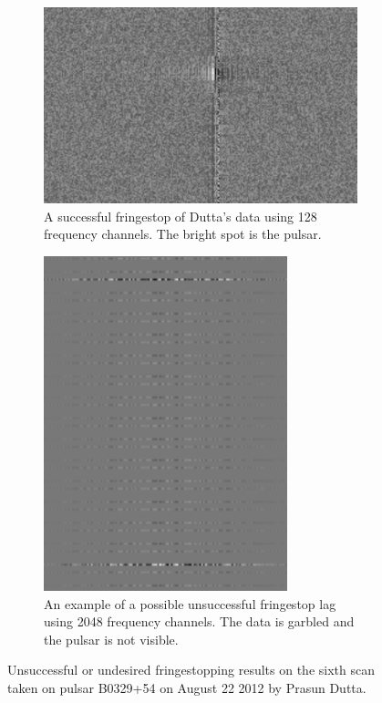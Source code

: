 \documentclass[a4paper,12pt]{article}
\begin{document}
\begin{figure}
\centering
\begin{subfigure}{0.5\textwidth}
  \centering
  \includegraphics[width=\linewidth]{256ChanLag.pdf}
  \caption{A successful fringestop of Dutta's data using 128 frequency channels. The bright spot is the pulsar.}
  \label{fig:sub1}
\end{subfigure}%
\begin{subfigure}{0.5\textwidth}
  \centering
  \includegraphics[width=0.8\linewidth]{4096ChanFailedLag.pdf}
  \caption{An example of a possible unsuccessful fringestop lag using 2048 frequency channels. The data is garbled and the pulsar is not visible.}
  \label{fig:sub2}
\end{subfigure}
\caption{Unsuccessful or undesired fringestopping results on the sixth scan taken on pulsar B0329+54 on August 22 2012 by Prasun Dutta.}
\label{fig:failedFS}
\end{figure}
\end{document}
